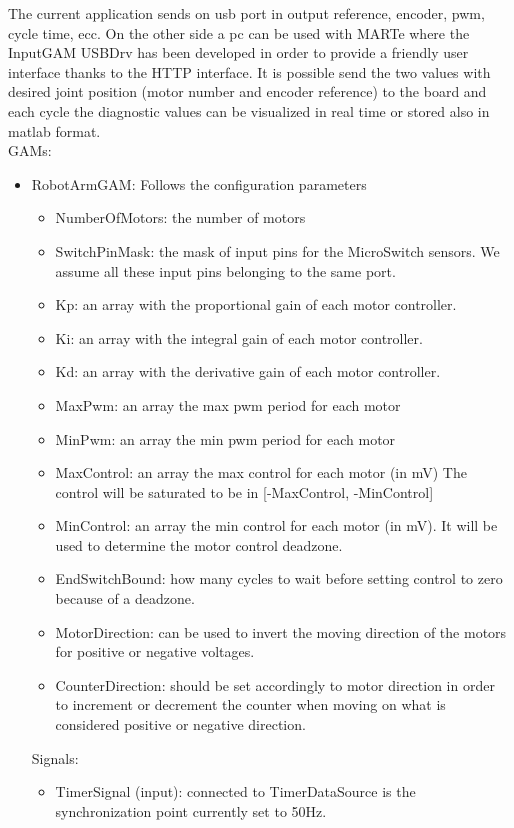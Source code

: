  The current application sends on usb port in output reference, encoder, pwm, cycle time, ecc. On the other side a pc can be used with MARTe where the InputGAM USBDrv has been developed in order to provide a friendly user interface thanks to the HTTP interface. It is possible send the two values with desired joint position (motor number and encoder reference) to the board and each cycle the diagnostic values can be visualized in real time or stored also in matlab format.\\
 GAMs:
 \begin{itemize}
 \item RobotArmGAM: Follows the configuration parameters
 \begin{itemize}
 \item NumberOfMotors: the number of motors 
 \item SwitchPinMask: the mask of input pins for the MicroSwitch sensors. We assume all these input pins belonging to the same port.
 \item Kp: an array with the proportional gain of each motor controller.
 \item Ki: an array with the integral gain of each motor controller.
 \item Kd: an array with the derivative gain of each motor controller.
 \item MaxPwm: an array the max pwm period for each motor
 \item MinPwm: an array the min pwm period for each motor
 \item MaxControl: an array the max control for each motor (in mV) The control will be saturated to be in [-MaxControl, -MinControl]
 \item MinControl: an array the min control for each motor (in mV). It will be used to determine the motor control deadzone.
 \item EndSwitchBound: how many cycles to wait before setting control to zero because of a deadzone.
 \item MotorDirection: can be used to invert the moving direction of the motors for positive or negative voltages.
 \item CounterDirection: should be set accordingly to motor direction in order to increment or decrement the counter when moving on what is considered positive or negative direction.
 \end{itemize} 
 Signals:
 \begin{itemize}
 \item TimerSignal (input): connected to TimerDataSource is the synchronization point currently set to 50Hz.

\end{itemize}
\end{itemize}
